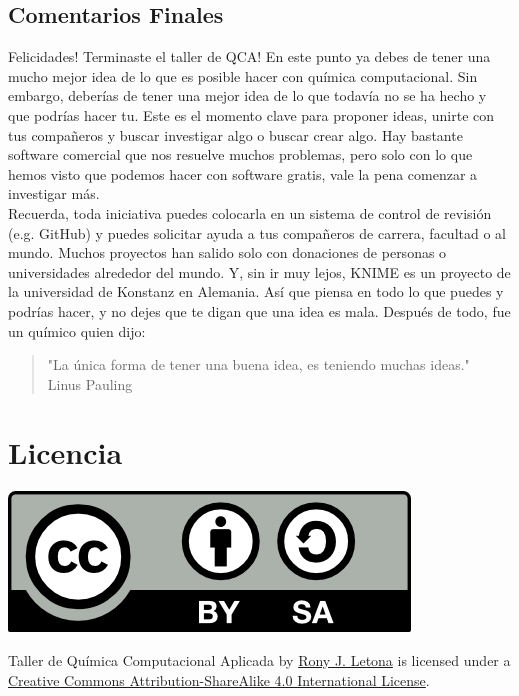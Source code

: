 \documentclass[10pt,letterpaper]{article}
\begin{document}
\subsection{Comentarios Finales}
Felicidades! Terminaste el taller de QCA! En este punto ya debes de tener una mucho mejor idea de lo que es posible hacer con qu\'imica computacional. Sin embargo, deber\'ias de tener una mejor idea de lo que todav\'ia no se ha hecho y que podr\'ias hacer tu. Este es el momento clave para proponer ideas, unirte con tus compa\~neros y buscar investigar algo o buscar crear algo. Hay bastante software comercial que nos resuelve muchos problemas, pero solo con lo que hemos visto que podemos hacer con software gratis, vale la pena comenzar a investigar m\'as.\\

Recuerda, toda iniciativa puedes colocarla en un sistema de control de revisi\'on (e.g. GitHub) y puedes solicitar ayuda a tus compa\~neros de carrera, facultad o al mundo. Muchos proyectos han salido solo con donaciones de personas o universidades alrededor del mundo. Y, sin ir muy lejos, KNIME es un proyecto de la universidad de Konstanz en Alemania. As\'i que piensa en todo lo que puedes y podr\'ias hacer, y no dejes que te digan que una idea es mala. Despu\'es de todo, fue un qu\'imico quien dijo:

\begin{flushright}
\begin{quote}
"La \'unica forma de tener una buena idea, es teniendo muchas ideas."\\
Linus Pauling
\end{quote}
\end{flushright}

\section*{Licencia}

\noindent \includegraphics{img/cc_big.png}

\noindent Taller de Qu\'imica Computacional Aplicada by \href{http://github.com/zronyj/TQCA}{Rony J. Letona} is licensed under a \href{http://creativecommons.org/licenses/by-sa/4.0/}{Creative Commons Attribution-ShareAlike 4.0 International License}.
\end{document}
